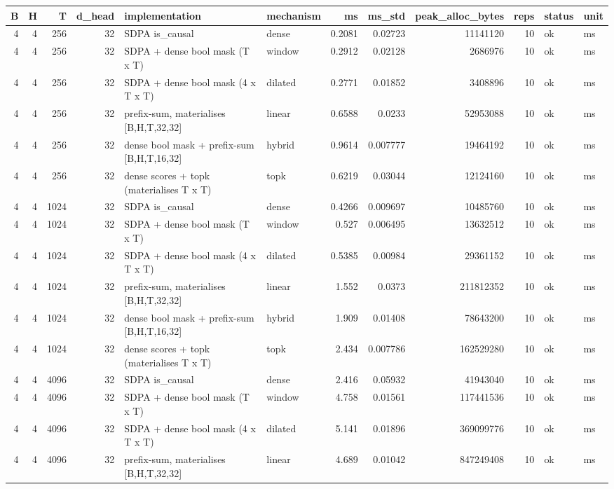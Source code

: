 \begin{table}
\label{tab:task2b_inference_sweep}
\begin{tabular}{rrrrllrrrrll}
\toprule
B & H & T & d\_head & implementation & mechanism & ms & ms\_std & peak\_alloc\_bytes & reps & status & unit \\
\midrule
4 & 4 & 256 & 32 & SDPA is\_causal & dense & 0.2081 & 0.02723 & 11141120 & 10 & ok & ms \\
4 & 4 & 256 & 32 & SDPA + dense bool mask (T x T) & window & 0.2912 & 0.02128 & 2686976 & 10 & ok & ms \\
4 & 4 & 256 & 32 & SDPA + dense bool mask (4 x T x T) & dilated & 0.2771 & 0.01852 & 3408896 & 10 & ok & ms \\
4 & 4 & 256 & 32 & prefix-sum, materialises [B,H,T,32,32] & linear & 0.6588 & 0.0233 & 52953088 & 10 & ok & ms \\
4 & 4 & 256 & 32 & dense bool mask + prefix-sum [B,H,T,16,32] & hybrid & 0.9614 & 0.007777 & 19464192 & 10 & ok & ms \\
4 & 4 & 256 & 32 & dense scores + topk (materialises T x T) & topk & 0.6219 & 0.03044 & 12124160 & 10 & ok & ms \\
4 & 4 & 1024 & 32 & SDPA is\_causal & dense & 0.4266 & 0.009697 & 10485760 & 10 & ok & ms \\
4 & 4 & 1024 & 32 & SDPA + dense bool mask (T x T) & window & 0.527 & 0.006495 & 13632512 & 10 & ok & ms \\
4 & 4 & 1024 & 32 & SDPA + dense bool mask (4 x T x T) & dilated & 0.5385 & 0.00984 & 29361152 & 10 & ok & ms \\
4 & 4 & 1024 & 32 & prefix-sum, materialises [B,H,T,32,32] & linear & 1.552 & 0.0373 & 211812352 & 10 & ok & ms \\
4 & 4 & 1024 & 32 & dense bool mask + prefix-sum [B,H,T,16,32] & hybrid & 1.909 & 0.01408 & 78643200 & 10 & ok & ms \\
4 & 4 & 1024 & 32 & dense scores + topk (materialises T x T) & topk & 2.434 & 0.007786 & 162529280 & 10 & ok & ms \\
4 & 4 & 4096 & 32 & SDPA is\_causal & dense & 2.416 & 0.05932 & 41943040 & 10 & ok & ms \\
4 & 4 & 4096 & 32 & SDPA + dense bool mask (T x T) & window & 4.758 & 0.01561 & 117441536 & 10 & ok & ms \\
4 & 4 & 4096 & 32 & SDPA + dense bool mask (4 x T x T) & dilated & 5.141 & 0.01896 & 369099776 & 10 & ok & ms \\
4 & 4 & 4096 & 32 & prefix-sum, materialises [B,H,T,32,32] & linear & 4.689 & 0.01042 & 847249408 & 10 & ok & ms \\

\end{tabular}
\end{table}
